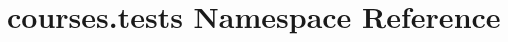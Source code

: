 \hypertarget{namespacecourses_1_1tests}{}\section{courses.\+tests Namespace Reference}
\label{namespacecourses_1_1tests}
